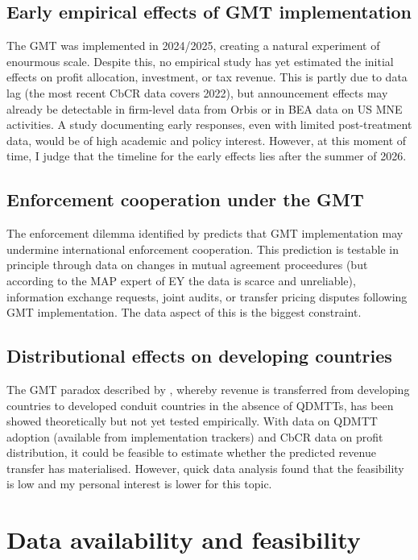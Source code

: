 \documentclass[11pt,a4paper]{article}
\begin{document}
\subsection{Early empirical effects of GMT implementation}

The GMT was implemented in 2024/2025, creating a natural experiment of enourmous scale. Despite this, no empirical study has yet estimated the initial effects on profit allocation, investment, or tax revenue. This is partly due to data lag (the most recent CbCR data covers 2022), but announcement effects may already be detectable in firm-level data from Orbis or in BEA data on US MNE activities. A study documenting early responses, even with limited post-treatment data, would be of high academic and policy interest. However, at this moment of time, I judge that the timeline for the early effects lies after the summer of 2026. 

\subsection{Enforcement cooperation under the GMT}

The enforcement dilemma identified by \citet{hindriks2025} predicts that GMT implementation may undermine international enforcement cooperation. This prediction is testable in principle through data on changes in mutual agreement proceedures (but according to the MAP expert of EY the data is scarce and unreliable), information exchange requests, joint audits, or transfer pricing disputes following GMT implementation. The data aspect of this is the biggest constraint. 

\subsection{Distributional effects on developing countries}

The GMT paradox described by \citet{vantriet2025}, whereby revenue is transferred from developing countries to developed conduit countries in the absence of QDMTTs, has been showed theoretically but not yet tested empirically. With data on QDMTT adoption (available from implementation trackers) and CbCR data on profit distribution, it could be feasible to estimate whether the predicted revenue transfer has materialised. However, quick data analysis found that the feasibility is low and my personal interest is lower for this topic. 

\section{Data availability and feasibility}\label{sec:data}
\end{document}
